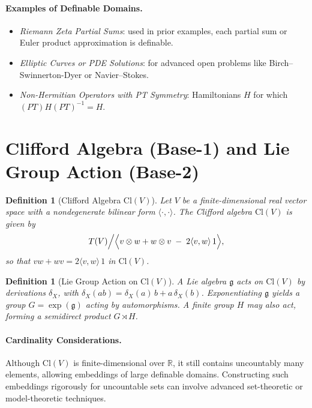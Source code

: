 \documentclass[11pt]{article}
\newtheorem{definition}[theorem]{Definition}
\begin{document}
\paragraph{Examples of Definable Domains.}
\begin{itemize}
    \item \emph{Riemann Zeta Partial Sums}: used in prior examples, each partial sum or Euler product approximation is definable.
    \item \emph{Elliptic Curves or PDE Solutions}: for advanced open problems like Birch--Swinnerton-Dyer or Navier--Stokes.
    \item \emph{Non-Hermitian Operators with PT Symmetry}: Hamiltonians $H$ for which $(PT) H (PT)^{-1} = H$.
\end{itemize}

\section{Clifford Algebra (Base-1) and Lie Group Action (Base-2)}

\begin{definition}[Clifford Algebra $\mathrm{Cl}(V)$]
Let $V$ be a finite-dimensional real vector space with a nondegenerate bilinear form $\langle \cdot,\cdot\rangle$.  The \emph{Clifford algebra} $\mathrm{Cl}(V)$ is given by
\[
T(V)\Big/\Bigl\langle v\otimes w + w\otimes v \;-\; 2\langle v,w\rangle\,1\Bigr\rangle,
\]
so that $v w + w v = 2\langle v,w\rangle\,1$ in $\mathrm{Cl}(V)$.
\end{definition}

\begin{definition}[Lie Group Action on $\mathrm{Cl}(V)$]
A Lie algebra $\mathfrak{g}$ acts on $\mathrm{Cl}(V)$ by derivations $\delta_X$, with $\delta_X(ab)=\delta_X(a)\,b + a\,\delta_X(b)$.  Exponentiating $\mathfrak{g}$ yields a group $G=\exp(\mathfrak{g})$ acting by automorphisms.  
A finite group $H$ may also act, forming a semidirect product $G\rtimes H$. 
\end{definition}

\paragraph{Cardinality Considerations.}
Although $\mathrm{Cl}(V)$ is finite-dimensional over $\mathbb{R}$, it still contains uncountably many elements, allowing embeddings of large definable domains.  Constructing such embeddings rigorously for uncountable sets can involve advanced set-theoretic or model-theoretic techniques.
\end{document}

